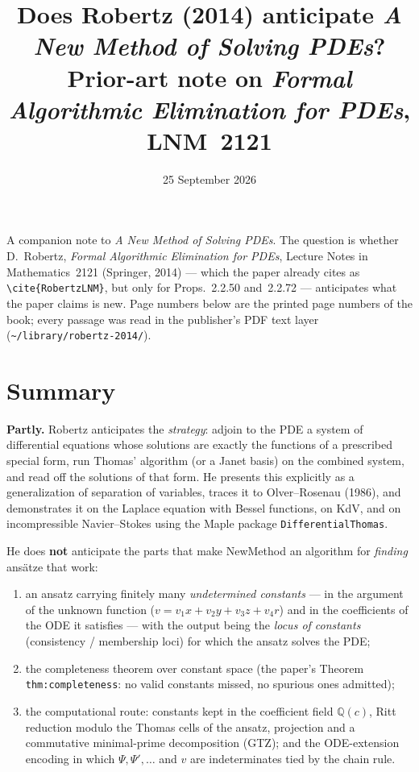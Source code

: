 \documentclass[11pt]{article}
\title{Does Robertz (2014) anticipate \emph{A New Method of Solving PDEs}?\\
       \large Prior-art note on \emph{Formal Algorithmic Elimination for PDEs}, LNM~2121}
\author{}
\date{25 September 2026}
\newcommand{\code}[1]{\texttt{#1}}
\newcommand{\QQ}{\mathbb{Q}}
\begin{document}
\maketitle

\noindent
A companion note to \emph{A New Method of Solving PDEs}. The question is
whether D.~Robertz, \emph{Formal Algorithmic Elimination for PDEs}, Lecture
Notes in Mathematics~2121 (Springer, 2014) --- which the paper already cites
as \verb|\cite{RobertzLNM}|, but only for Props.~2.2.50 and~2.2.72 ---
anticipates what the paper claims is new. Page numbers below are the printed
page numbers of the book; every passage was read in the publisher's PDF text
layer (\code{\textasciitilde/library/robertz-2014/}).

\section*{Summary}

\textbf{Partly.} Robertz anticipates the \emph{strategy}: adjoin to the PDE a
system of differential equations whose solutions are exactly the functions
of a prescribed special form, run Thomas' algorithm (or a Janet basis) on the
combined system, and read off the solutions of that form. He presents this
explicitly as a generalization of separation of variables, traces it to
Olver--Rosenau (1986), and demonstrates it on the Laplace equation with
Bessel functions, on KdV, and on incompressible Navier--Stokes using the Maple
package \code{DifferentialThomas}.

He does \textbf{not} anticipate the parts that make NewMethod an algorithm
for \emph{finding} ans\"atze that work:
\begin{enumerate}
\item an ansatz carrying finitely many \emph{undetermined constants} ---
  in the argument of the unknown function ($v = v_1x+v_2y+v_3z+v_4r$) and in
  the coefficients of the ODE it satisfies --- with the output being the
  \emph{locus of constants} (consistency / membership loci) for which the
  ansatz solves the PDE;
\item the completeness theorem over constant space
  (the paper's Theorem \verb|thm:completeness|: no valid constants
  missed, no spurious ones admitted);
\item the computational route: constants kept in the coefficient field
  $\QQ(c)$, Ritt reduction modulo the Thomas cells of the ansatz, projection
  and a commutative minimal-prime decomposition (GTZ); and the ODE-extension
  encoding in which $\Psi,\Psi',\dots$ and $v$ are indeterminates tied by the
  chain rule.
\end{enumerate}
\end{document}

